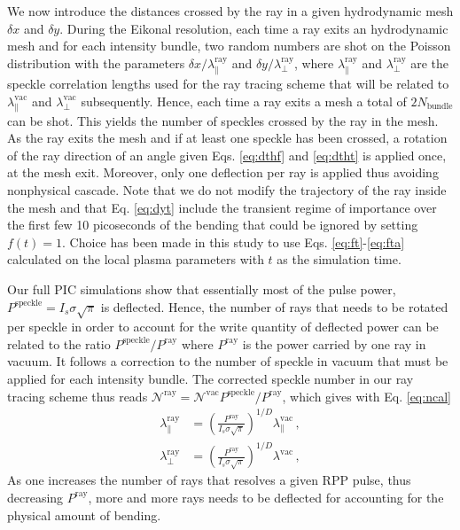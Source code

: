 \documentclass[%
 reprint,
 amsmath,amssymb,
 aps,
]{revtex4-1}
\begin{document}
We now introduce the distances crossed by the ray in a given hydrodynamic mesh $\delta x$ and $\delta y$. 
During the Eikonal resolution, each time a ray exits an hydrodynamic mesh and for each intensity bundle,  two random numbers are shot  on the Poisson distribution with  the parameters $\delta x/\lambda^\mathrm{ray}_\parallel$ and $\delta y /\lambda^\mathrm{ray}_\perp$, where $\lambda^\mathrm{ray}_\parallel$ and $\lambda^\mathrm{ray}_\perp$ are the speckle correlation lengths used for the ray tracing scheme that will be related to $\lambda^\mathrm{vac}_\parallel$ and $\lambda^\mathrm{vac}_\perp$ subsequently.
Hence, each time a ray exits  a mesh a total of $2N_\mathrm{bundle}$ can be shot. 
This yields the number of speckles crossed by the ray in the mesh. As the ray exits the mesh and if at least one speckle has been crossed, a rotation  of the ray direction of an angle given  Eqs. \eqref{eq:dthf} and \eqref{eq:dtht}  is applied once, at the mesh exit. Moreover, only one deflection per ray is applied thus avoiding nonphysical cascade. Note that we do not modify the trajectory of the ray inside the mesh and that  Eq. \eqref{eq:dyt} include the transient regime of importance over the first few 10 picoseconds of the bending that could be ignored by setting $f(t)=1$. Choice has been made in this study to use Eqs. \eqref{eq:ft}-\eqref{eq:fta} calculated on the local plasma parameters with $t$ as the simulation time. 

Our full PIC  simulations show that essentially most of the pulse power, $P^\mathrm{speckle}= I_s\sigma \sqrt{\pi}$ is deflected.
Hence,  the number of rays that needs to be 
rotated per speckle in order to account for the write quantity of deflected power  can be related to the ratio  $P^\mathrm{speckle}/P^\mathrm{ray}$ where $P^\mathrm{ray}$ is the power carried by one ray in vacuum. 
It follows
a correction to the number of speckle in vacuum that must be applied for each  intensity bundle.
The corrected speckle number in our ray tracing scheme thus reads $\mathcal{N}^\mathrm{ray}=  \mathcal{N}^\mathrm{vac}P^\mathrm{speckle}/P^\mathrm{ray} $, which gives with Eq. \eqref{eq:ncal}
\begin{align}
\lambda^\mathrm{ray}_\parallel & = \left( \frac{P^\mathrm{ray}}{ I_s\sigma \sqrt{\pi} } \right)^{1/D} \lambda^\mathrm{vac}_\parallel \, ,\label{eq:ldxr} \\
\lambda^\mathrm{ray}_\perp   & = \left( \frac{P^\mathrm{ray}}{ I_s\sigma \sqrt{\pi} } \right)^{1/D}  \lambda^\mathrm{vac}\, ,\label{eq:ldyr}  
\end{align}
As one increases the number of rays that resolves a given RPP pulse, thus decreasing $P^\mathrm{ray}$, more and more rays needs to be deflected for accounting for the physical amount of bending.
\end{document}
